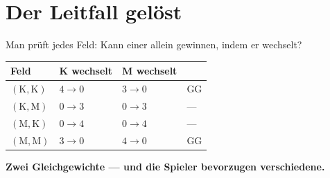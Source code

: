\section{Der Leitfall gelöst}

\begin{merksatz}
Man prüft jedes Feld: Kann einer allein gewinnen, indem er wechselt?

\begin{center}
{\small
\renewcommand{\arraystretch}{1.5}
\begin{tabular}{@{}P{1.8cm}P{2.4cm}P{2.4cm}P{1.4cm}@{}}
\toprule
\textbf{Feld} & \textbf{K wechselt} & \textbf{M wechselt} & \\
\midrule
$(\text{K},\text{K})$ & $4 \to 0$ & $3 \to 0$ & \textcolor{gruen}{GG}\\
$(\text{K},\text{M})$ & $0 \to 3$ & $0 \to 3$ & ---\\
$(\text{M},\text{K})$ & $0 \to 4$ & $0 \to 4$ & ---\\
$(\text{M},\text{M})$ & $3 \to 0$ & $4 \to 0$ & \textcolor{gruen}{GG}\\
\bottomrule
\end{tabular}}
\end{center}

\begin{center}
\begin{minipage}{0.9\textwidth}
\textbf{Zwei Gleichgewichte --- und die Spieler bevorzugen verschiedene.}
\end{minipage}
\end{center}

\begin{center}
\begin{minipage}{0.88\textwidth}
\end{minipage}
\end{center}
\end{merksatz}

